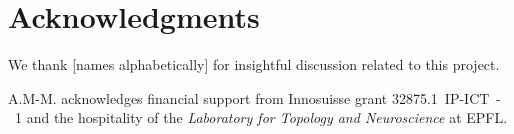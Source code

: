 
\section*{Acknowledgments}

We thank [names alphabetically] for insightful discussion related to this project.

A.M-M. acknowledges financial support from Innosuisse grant 32875.1~IP-ICT~-~1 and the hospitality of the \textit{Laboratory for Topology and Neuroscience} at EPFL.

